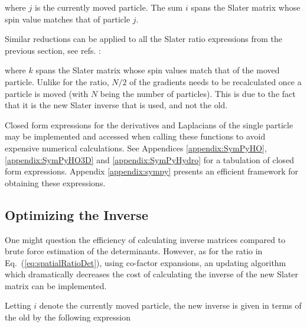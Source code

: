 where $j$ is the currently moved particle. The sum $i$ spans the Slater matrix whose spin value matches that of particle $j$.


Similar reductions can be applied to all the Slater ratio expressions from the previous section, see refs. \cite{abInitioMC, morten}:


where $k$ spans the Slater matrix whose spin values match that of the moved particle. Unlike for the ratio, $N/2$ of the gradients needs to be recalculated once a particle is moved (with $N$ being the number of particles). This is due to the fact that it is the new Slater inverse that is used, and not the old.

Closed form expressions for the derivatives and Laplacians of the single particle may be implemented and accessed when calling these functions to avoid expensive numerical calculations. See Appendices \ref{appendix:SymPyHO}, \ref{appendix:SymPyHO3D} and \ref{appendix:SymPyHydro} for a tabulation of closed form expressions. Appendix \ref{appendix:sympy} presents an efficient framework for obtaining these expressions.

\subsection{Optimizing the Inverse}
\label{sec:optInv}

One might question the efficiency of calculating inverse matrices compared to brute force estimation of the determinants. However, as for the ratio in Eq.~(\ref{eq:spatialRatioDet}), using co-factor expansions, an updating algorithm which dramatically decreases the cost of calculating the inverse of the new Slater matrix can be implemented.

Letting $i$ denote the currently moved particle, the new inverse is given in terms of the old by the following expression \cite{abInitioMC, morten}


